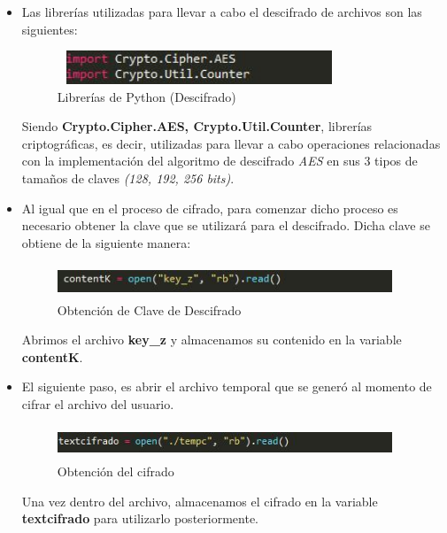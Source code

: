 \begin{itemize}
	\item Las librerías utilizadas para llevar a cabo el descifrado de archivos son las siguientes: 
			\begin{figure}[H]
			\centering
			\includegraphics[width=8.5cm, height=1cm]{./images/descifrado/01.jpg}
			\caption{Librerías de Python (Descifrado)}
			\label{fig:6-3-1} 
			\end{figure} 
Siendo \textbf{Crypto.Cipher.AES, Crypto.Util.Counter}, librerías criptográficas, es decir, utilizadas para llevar a cabo operaciones relacionadas con la implementación del algoritmo de descifrado \textit{AES} en sus 3 tipos de tamaños de claves \textit{(128, 192, 256 bits)}. 

	\item Al igual que en el proceso de cifrado, para comenzar dicho proceso es necesario obtener la clave que se utilizará para el descifrado. Dicha clave se obtiene de la siguiente manera:  

			\begin{figure}[H]
			\centering
			\includegraphics[width=10cm, height=1cm]{./images/cifrado/02.jpg}
			\caption{Obtención de Clave de Descifrado}
			\label{fig:6-3-2} 
			\end{figure} 

Abrimos el archivo \textbf{key\_z} y almacenamos su contenido en la variable \textbf{contentK}. 

		\item El siguiente paso, es abrir el archivo temporal que se generó al momento de cifrar el archivo del usuario. 
			\begin{figure}[H]
			\centering
			\includegraphics[width=10cm, height=1cm]{./images/descifrado/03.jpg}
			\caption{Obtención del cifrado}
			\label{fig:6-3-3} 
			\end{figure} 

Una vez dentro del archivo, almacenamos el cifrado en la variable \textbf{textcifrado} para utilizarlo posteriormente. 


\end{itemize}
